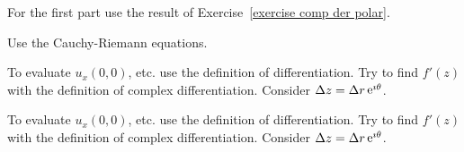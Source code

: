 {\begin{Hint}
  \label{hint constant real imaginary modulus}
\end{Hint}





\begin{Hint}
  \label{hint e-z-4}
\end{Hint}




\begin{Hint}
  \label{hint C-R polar form polar coords}
  For the first part use the result of Exercise~\ref{exercise comp der polar}.
\end{Hint}





\begin{Hint}
  \label{hint ol f(z)}
  Use the Cauchy-Riemann equations.
\end{Hint}







\begin{Hint}
  \label{hint diff x3f3}
\end{Hint}











\begin{Hint}
  \label{hint C-R x43y53}
  To evaluate $u_x(0,0)$, etc. use the definition of differentiation.
  Try to find $f'(z)$ with the definition of complex differentiation.
  Consider $\Delta z = \Delta r \mathop{\mathrm{e}}\nolimits^{\imath \theta}$.
\end{Hint}





\begin{Hint}
  \label{hint C-R x31iy31i}
  To evaluate $u_x(0,0)$, etc. use the definition of differentiation.
  Try to find $f'(z)$ with the definition of complex differentiation.
  Consider $\Delta z = \Delta r \mathop{\mathrm{e}}\nolimits^{\imath \theta}$.
\end{Hint}







}
